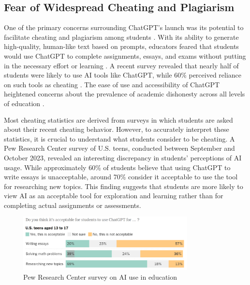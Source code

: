 \documentclass{article}
\begin{document}
\subsection{Fear of Widespread Cheating and Plagiarism}
One of the primary concerns surrounding ChatGPT's launch was its potential to facilitate cheating and plagiarism among students \cite{https://oai.missouri.edu/chatgpt-artificial-intelligence-and-academic-integrity/} \cite{https://informationmatters.org/2023/02/chatgpt-and-academic-integrity/} \cite{https://www.reddit.com/r/changemyview/comments/123m3xr/cmv_using_chatgpt_for_academic_purposes_is_not_an/}. With its ability to generate high-quality, human-like text based on prompts, educators feared that students would use ChatGPT to complete assignments, essays, and exams without putting in the necessary effort or learning \cite{https://oai.missouri.edu/chatgpt-artificial-intelligence-and-academic-integrity/} \cite{https://www.reddit.com/r/changemyview/comments/123m3xr/cmv_using_chatgpt_for_academic_purposes_is_not_an/}.
A recent survey revealed that nearly half of students were likely
to use AI tools like ChatGPT, while 60\% perceived reliance on
such tools as cheating \cite{https://oai.missouri.edu/chatgpt-artificial-intelligence-and-academic-integrity/}.
The ease of use and accessibility of ChatGPT heightened concerns
about the prevalence of academic dishonesty across all levels of
education \cite{https://informationmatters.org/2023/02/chatgpt-and-academic-integrity/}
\cite{https://www.reddit.com/r/changemyview/comments/123m3xr/cmv_using_chatgpt_for_academic_purposes_is_not_an/}.

Most cheating statistics are derived from surveys in which students
are asked about their recent cheating behavior.
However, to accurately interpret these statistics, it is crucial
to understand what students consider to be cheating.
A Pew Research Center survey of U.S. teens, conducted between
September and October 2023, revealed an interesting discrepancy
in students' perceptions of AI usage. While approximately 60\%
of students believe that using ChatGPT to write essays is unacceptable, around 70\%
consider it acceptable to use the tool for researching new topics.
This finding suggests that students are more likely to view AI
as an acceptable tool for exploration and learning rather than for
completing actual assignments or assessments.

\begin{figure}
    \centering
    \includegraphics[width=0.8\textwidth]{images/chatgpt_acceptable_usecases.png}
    \caption{Pew Research Center survey on AI use in education}
\end{figure}
\end{document}
